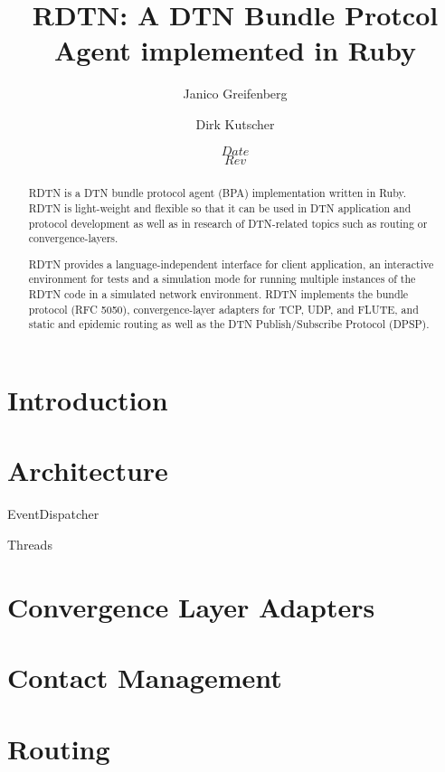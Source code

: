 \documentclass{article}
\begin{document}
\title{RDTN: A DTN Bundle Protcol Agent implemented in Ruby}

\author{Janico Greifenberg \and Dirk Kutscher}
\date{$Date$\\
$Rev$}

\maketitle

\begin{abstract}

RDTN is a DTN bundle protocol agent (BPA) implementation written in Ruby. RDTN
is light-weight and flexible so that it can be used in DTN application and
protocol development as well as in research of DTN-related topics such as
routing or convergence-layers. 

RDTN provides a language-independent interface for client application, an
interactive environment for tests and a simulation mode for running multiple
instances of the RDTN code in a simulated network environment. RDTN implements
the bundle protocol (RFC 5050), convergence-layer adapters for TCP, UDP, and
FLUTE, and static and epidemic routing as well as the DTN Publish/Subscribe
Protocol (DPSP).

\end{abstract}

\section{Introduction}\label{sec.intro}

\section{Architecture}\label{sec.arch}

EventDispatcher

Threads

\section{Convergence Layer Adapters}\label{sec.cl}

\section{Contact Management}\label{sec.contact-mngt}

\section{Routing}\label{sec.routing}
\end{document}
